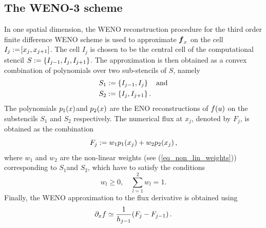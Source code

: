 \documentclass[final]{amsart}
\renewcommand{\vect}[1]{\geovec{#1}}
\numberwithin{equation}{section}
\begin{document}
\subsection{The WENO-3 scheme}\label{subsec:WENO-3} In one spatial dimension, the WENO reconstruction procedure for the third order finite difference WENO scheme is used to approximate  $\vect f_x$ on the cell $I_j:=\!\left[{x_j, x_{j+1}}\right]$.  The cell $I_j$ is chosen to be the central cell of the computational stencil $S:=\left\lbrace I_{j-1}, I_j, I_{j+1}\right\rbrace$.  The approximation is then obtained as a convex combination of polynomials over two sub-stencils of $S$, namely 
\begin{equation}
\begin{aligned}
S_1&:=\left\lbrace I_{j-1}, I_j\right\rbrace\quad \text{and}\\
S_2&:=\left\lbrace I_{j}, I_{j+1}\right\rbrace.
\end{aligned}
\end{equation}
The polynomials $p_1\!\left({x}\right)$and
$p_2\!\left({x}\right)$ are the ENO reconstructions of $f\!\left({u}\right)$
on the substencils $S_1$ and $S_2$
respectively.  The numerical flux at $x_{j}$, denoted by
$F_{j}$, is obtained as the combination
\begin{equation}\label{eq_f_WENO}
F_{j}:=w_1p_1\!\left({x_{j}}\right) +w_2p_2\!\left({x_{j}}\right),
\end{equation}
where $w_1$ and $w_2$ are the non-linear weights (see (\ref{eq_non_lin_weights})) corresponding to $S_1$and $S_2$, which have to satisfy the conditions
\begin{equation}
w_l\geq 0,\quad \sum_{l=1}^2 w_l = 1.
\end{equation}
Finally, the WENO approximation to the flux derivative is obtained using
\begin{equation}\label{eq_WENO_approx_flux_derivative}
\partial_x f\simeq \frac{1}{h_{j-1}}\!\left({F_{j}- F_{j-1}}\right).
\end{equation}
\end{document}
